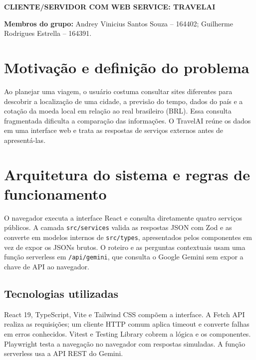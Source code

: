 \documentclass[a4paper,11pt]{article}
\begin{document}
\thispagestyle{firstpage}
\justifying
\vspace*{0.5cm}
\begin{center}\textbf{CLIENTE/SERVIDOR COM WEB SERVICE: TRAVELAI}\end{center}
\vspace{0.5cm}
\noindent\textbf{Membros do grupo:} Andrey Vinicius Santos Souza -- 164402; Guilherme Rodrigues Estrella -- 164391.

\section{Motivação e definição do problema}
Ao planejar uma viagem, o usuário costuma consultar sites diferentes para descobrir a localização de uma cidade, a previsão do tempo, dados do país e a cotação da moeda local em relação ao real brasileiro (BRL). Essa consulta fragmentada dificulta a comparação das informações. O TravelAI reúne os dados em uma interface web e trata as respostas de serviços externos antes de apresentá-las.

\section{Arquitetura do sistema e regras de funcionamento}
O navegador executa a interface React e consulta diretamente quatro serviços públicos. A camada \texttt{src/services} valida as respostas JSON com Zod e as converte em modelos internos de \texttt{src/types}, apresentados pelos componentes em vez de expor os JSONs brutos. O roteiro e as perguntas contextuais usam uma função serverless em \texttt{/api/gemini}, que consulta o Google Gemini sem expor a chave de API ao navegador.

\subsection{Tecnologias utilizadas}
React 19, TypeScript, Vite e Tailwind CSS compõem a interface. A Fetch API realiza as requisições; um cliente HTTP comum aplica timeout e converte falhas em erros conhecidos. Vitest e Testing Library cobrem a lógica e os componentes. Playwright testa a navegação no navegador com respostas simuladas. A função serverless usa a API REST do Gemini.
\end{document}
